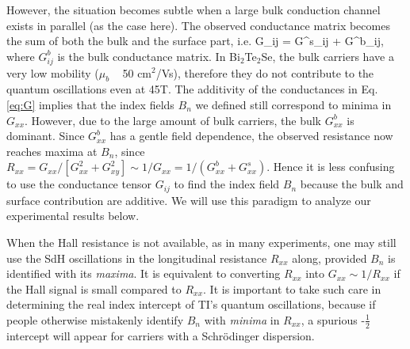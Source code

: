 However, the situation becomes subtle when a large
bulk conduction channel exists in parallel (as the case here). The observed conductance matrix
becomes the sum of both the bulk and the surface part, i.e.
\be
G_{ij} = G^s_{ij} + G^b_{ij},
\label{eq:G}
\ee
where $G^b_{ij}$ is the bulk conductance matrix. In Bi$_2$Te$_2$Se, the bulk carriers have a very low mobility ($\mu_b$ ~ 50 cm$^2$/Vs), therefore they do not contribute to the quantum oscillations even at 45T. The additivity of the conductances in Eq. \ref{eq:G} implies that the index fields $B_n$ we defined still correspond to minima in $G_{xx}$. However, due to the large amount of bulk carriers, the bulk $G^b_{xx}$ is dominant. Since $G^b_{xx}$ has a gentle field dependence, the observed resistance now reaches maxima at $B_n$, since $R_{xx} = G_{xx}/[G_{xx}^2+G_{xy}^2]\sim 1/G_{xx} = 1/(G^b_{xx}+G^s_{xx})$. Hence it is less confusing to use the conductance tensor $G_{ij}$ to find the index field $B_n$ because the bulk and surface contribution are additive. We will use this paradigm to analyze our experimental results below. 

When the Hall resistance is not available, as in many experiments, one may still use the SdH oscillations in the longitudinal resistance $R_{xx}$ along, provided $B_n$ is identified with its \emph{maxima}. It is equivalent to converting $R_{xx}$ into $G_{xx} \sim 1/R_{xx}$ if the Hall signal is small compared to $R_{xx}$. It is important to take such care in determining the real index intercept of TI's quantum oscillations, because if people otherwise mistakenly identify $B_n$ with \emph{minima} in $R_{xx}$, a spurious -$\frac12$ intercept will appear for carriers with a Schr\"{o}dinger dispersion.




